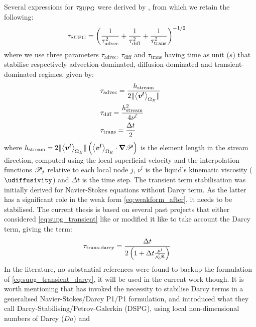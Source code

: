 Several expressions for $\tau_\text{SUPG}$ were derived by \citet{tezduyar_incompressible_1992,tezduyar_finite_2000}, from which
we retain the following:
\begin{align}
& \tau_\text{SUPG} = \left( \frac{1}{\tau_\text{advec}^2} + \frac{1}{\tau_\text{diff}^2} + \frac{1}{\tau_\text{trans}^2}  \right)^{-1/2}
\end{align}
where we use three parameters $\tau_\text{advec}$, $\tau_\text{diff}$ and $\tau_\text{trans}$ 
having time as unit ($s$) that stabilise respectively advection-dominated, diffusion-dominated and transient-dominated
regimes, given by:
\begin{align}
& \tau_\text{advec} = \frac{h_\text{stream}}{2 \lVert \left \langle \boldsymbol{v^l} \right \rangle_{\Omega_E} \rVert}  \\ 
& \tau_\text{diff} = \frac{h_\text{stream}^2}{4\nu^l}  \\ 
\label{eq:supg_transient}
& \tau_\text{trans} = \frac{\Delta t}{2}
\end{align}
where $h_\text{stream}=2\lVert \left \langle \boldsymbol{v^l} \right \rangle_{\Omega_E} \rVert\left( \left \langle \boldsymbol{v^l} \right \rangle_{\Omega_E} \cdot \boldsymbol{\nabla} \mathscr{P} \right)$ is the element length in the stream direction, computed using
the local superficial velocity and the interpolation functions $\mathscr{P}_j$ relative to each local node $j$,
$\nu^l$ is the liquid's kinematic viscosity ($\si{\udiffusivity}$) and $\Delta t$ is the time step.
The transient term stabilisation was initially derived for Navier-Stokes equations without Darcy term.
As the latter has a significant role in the weak form \cref{eq:weakform_after}, it needs to be stabilised.
The current thesis is based on several past projects that either considered \cref{eq:supg_transient}
like \citet{liu_finite_2005} or modified it like \citet{gouttebroze_modelisation_2005,rivaux_simulation_2011} 
to take account the Darcy term, giving the term:
\begin{align}
\label{eq:supg_transient_darcy}
& \tau_\text{trans-darcy} = \frac{\Delta t}{2\left( 1+\Delta t \frac{\mu^l}{\rho_{0}^{l} \mathbb{K}} \right)}
\end{align}
In the literature, no substantial references were found to backup the formulation of \cref{eq:supg_transient_darcy}, it will
be used in the current work though. It is worth mentioning that \citet{zabaras_stabilized_2004} has invoked the necessity
to stabilise Darcy terms in a generalised Navier-Stokes/Darcy P1/P1 formulation, 
and introduced what they call Darcy-Stabilising/Petrov-Galerkin (DSPG), using local non-dimensional numbers of Darcy ($Da$) and

